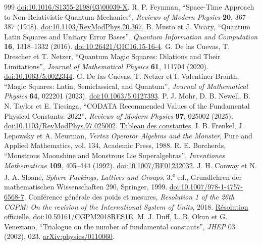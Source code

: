 \begin{thebibliography}{999}
\href{https://doi.org/10.1016/S1355-2198(03)00039-X}{doi:10.1016/S1355-2198(03)00039-X}.
 R. P. Feynman, ``Space-Time Approach to Non-Relativistic Quantum Mechanics'', \emph{Reviews of Modern Physics} \textbf{20}, 367--387 (1948). \href{https://doi.org/10.1103/RevModPhys.20.367}{doi:10.1103/RevModPhys.20.367}.
 B. Musto et J. Vicary, ``Quantum Latin Squares and Unitary Error Bases'', \emph{Quantum Information and Computation} \textbf{16}, 1318--1332 (2016). \href{https://doi.org/10.26421/QIC16.15-16-4}{doi:10.26421/QIC16.15-16-4}.
 G. De las Cuevas, T. Drescher et T. Netzer, ``Quantum Magic Squares: Dilations and Their Limitations'', \emph{Journal of Mathematical Physics} \textbf{61}, 111704 (2020). \href{https://doi.org/10.1063/5.0022344}{doi:10.1063/5.0022344}.
 G. De las Cuevas, T. Netzer et I. Valentiner-Branth, ``Magic Squares: Latin, Semiclassical, and Quantum'', \emph{Journal of Mathematical Physics} \textbf{64}, 022201 (2023). \href{https://doi.org/10.1063/5.0127393}{doi:10.1063/5.0127393}.
 P. J. Mohr, D. B. Newell, B. N. Taylor et E. Tiesinga, ``CODATA Recommended Values of the Fundamental Physical Constants: 2022'', \emph{Reviews of Modern Physics} \textbf{97}, 025002 (2025). \href{https://doi.org/10.1103/RevModPhys.97.025002}{doi:10.1103/RevModPhys.97.025002}. \href{https://physics.nist.gov/cuu/Constants/Table/allascii.txt}{Tableau des constantes}.
 I. B. Frenkel, J. Lepowsky et A. Meurman, \emph{Vertex Operator Algebras and the Monster}, Pure and Applied Mathematics, vol. 134, Academic Press, 1988.
 R. E. Borcherds, ``Monstrous Moonshine and Monstrous Lie Superalgebras'', \emph{Inventiones Mathematicae} \textbf{109}, 405--444 (1992). \href{https://doi.org/10.1007/BF01232032}{doi:10.1007/BF01232032}.
 J. H. Conway et N. J. A. Sloane, \emph{Sphere Packings, Lattices and Groups}, 3.\textsuperscript{e} ed., Grundlehren der mathematischen Wissenschaften 290, Springer, 1999. \href{https://doi.org/10.1007/978-1-4757-6568-7}{doi:10.1007/978-1-4757-6568-7}.
 Conférence générale des poids et mesures, \emph{Resolution 1 of the 26th CGPM: On the revision of the International System of Units}, 2018. \href{https://www.bipm.org/en/committees/cg/cgpm/26-2018/resolution-1}{Résolution officielle}. \href{https://doi.org/10.59161/CGPM2018RES1E}{doi:10.59161/CGPM2018RES1E}.
 M. J. Duff, L. B. Okun et G. Veneziano, ``Trialogue on the number of fundamental constants'', \emph{JHEP} 03 (2002), 023. \href{https://arxiv.org/abs/physics/0110060}{arXiv:physics/0110060}.

\end{thebibliography}
